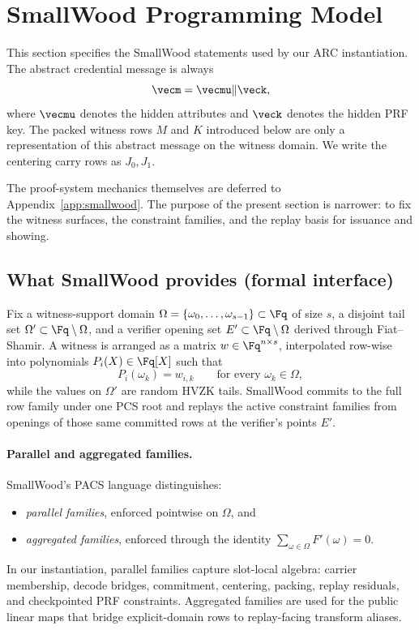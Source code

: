 \section{SmallWood Programming Model}
\label{sec:smallwood-model}

This section specifies the SmallWood statements used by our ARC
instantiation. The abstract credential message is always
\[
  \vecm=\vecmu\Vert \veck,
\]
where \(\vecmu\) denotes the hidden attributes and \(\veck\) denotes the
hidden PRF key. The packed witness rows \(M\) and \(K\) introduced below are
only a representation of this abstract message on the witness domain. We
write the centering carry rows as \(J_0,J_1\).

The proof-system mechanics themselves are deferred to
Appendix~\ref{app:smallwood}. The purpose of the present section is narrower:
to fix the witness surfaces, the constraint families, and the replay basis for
issuance and showing.

\subsection{What SmallWood provides (formal interface)}
Fix a witness-support domain
\(\Omega=\{\omega_0,\dots,\omega_{s-1}\}\subset\Fq\) of size \(s\), a
disjoint tail set \(\Omega'\subset\Fq\setminus\Omega\), and a verifier opening
set \(E'\subset\Fq\setminus\Omega\) derived through Fiat--Shamir. A witness is
arranged as a matrix \(w\in\Fq^{n\times s}\), interpolated row-wise into
polynomials \(P_i(X)\in\Fq[X]\) such that
\[
  P_i(\omega_k)=w_{i,k}\qquad\text{for every }\omega_k\in\Omega,
\]
while the values on \(\Omega'\) are random HVZK tails. SmallWood commits to
the full row family under one PCS root and replays the active constraint
families from openings of those same committed rows at the verifier's points
\(E'\).

\paragraph{Parallel and aggregated families.}
SmallWood's PACS language distinguishes:
\begin{itemize}[leftmargin=1.25em]
  \item \emph{parallel families}, enforced pointwise on \(\Omega\), and
  \item \emph{aggregated families}, enforced through the identity
  \(\sum_{\omega\in\Omega}F'(\omega)=0\).
\end{itemize}
In our instantiation, parallel families capture slot-local algebra:
carrier membership, decode bridges, commitment, centering, packing, replay
residuals, and checkpointed PRF constraints. Aggregated families are used for
the public linear maps that bridge explicit-domain rows to replay-facing
transform aliases.

